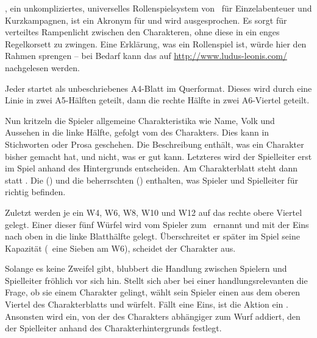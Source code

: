\begin{multicols}{2}


\nipajin, ein unkompliziertes, universelles Rollenspielsystem von \ludusleonis\ für Einzelabenteuer und Kurzkampagnen, ist ein Akronym für  und wird  ausgesprochen. Es sorgt für verteiltes Rampenlicht zwischen den Charakteren, ohne diese in ein enges Regelkorsett zu zwingen. Eine Erklärung, was ein Rollenspiel ist, würde hier den Rahmen sprengen -- bei Bedarf kann das auf \href{http://www.ludus-leonis.com/}{http://www.ludus-leonis.com/} nachgelesen werden.


Jeder  startet als unbeschriebenes A4-Blatt im Querformat. Dieses  wird durch eine Linie in zwei A5-Hälften geteilt, dann die rechte Hälfte in zwei A6-Viertel geteilt. 

Nun kritzeln die Spieler allgemeine Charakteristika wie Name, Volk und Aussehen in die linke Hälfte, gefolgt vom  des Charakters. Dies kann in Stichworten oder Prosa geschehen. Die Beschreibung enthält, was ein Charakter bisher gemacht hat, und nicht, was er gut kann. Letzteres wird der Spielleiter erst im Spiel anhand des Hintergrunds entscheiden. Am Charakterblatt steht dann \zB\  statt . Die  () und die beherrschten  () enthalten, was Spieler und Spielleiter für richtig befinden. 

Zuletzt werden je ein W4, W6, W8, W10 und W12 auf das rechte obere Viertel gelegt. Einer dieser fünf Würfel wird vom Spieler zum  \WW\ ernannt und mit der Eins nach oben in die linke Blatthälfte gelegt. Überschreitet er später im Spiel seine Kapazität (\zB\ eine Sieben am W6), scheidet der Charakter aus.


Solange es keine Zweifel gibt, blubbert die Handlung zwischen Spielern und Spielleiter fröhlich vor sich hin. Stellt sich aber bei einer handlungsrelevanten  die Frage, ob sie einem Charakter gelingt, wählt sein Spieler einen  aus dem oberen Viertel des Charakterblatts und würfelt. Fällt eine Eins, ist die Aktion ein . Ansonsten wird ein, von der  des Charakters abhängiger  zum Wurf addiert, den der Spielleiter anhand des Charakterhintergrunds festlegt.


\end{multicols}
